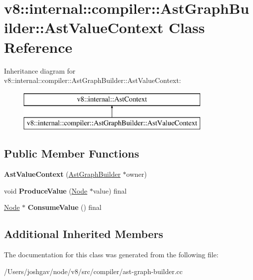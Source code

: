 \hypertarget{classv8_1_1internal_1_1compiler_1_1_ast_graph_builder_1_1_ast_value_context}{}\section{v8\+:\+:internal\+:\+:compiler\+:\+:Ast\+Graph\+Builder\+:\+:Ast\+Value\+Context Class Reference}
\label{classv8_1_1internal_1_1compiler_1_1_ast_graph_builder_1_1_ast_value_context}
Inheritance diagram for v8\+:\+:internal\+:\+:compiler\+:\+:Ast\+Graph\+Builder\+:\+:Ast\+Value\+Context\+:\begin{figure}[H]
\begin{center}
\leavevmode
\includegraphics[height=2.000000cm]{classv8_1_1internal_1_1compiler_1_1_ast_graph_builder_1_1_ast_value_context}
\end{center}
\end{figure}
\subsection*{Public Member Functions}
\begin{DoxyCompactItemize}
\item 
{\bfseries Ast\+Value\+Context} (\hyperlink{classv8_1_1internal_1_1compiler_1_1_ast_graph_builder}{Ast\+Graph\+Builder} $\ast$owner)\hypertarget{classv8_1_1internal_1_1compiler_1_1_ast_graph_builder_1_1_ast_value_context_af1910abb08a912c34739fc864de6ffad}{}\label{classv8_1_1internal_1_1compiler_1_1_ast_graph_builder_1_1_ast_value_context_af1910abb08a912c34739fc864de6ffad}

\item 
void {\bfseries Produce\+Value} (\hyperlink{classv8_1_1internal_1_1compiler_1_1_node}{Node} $\ast$value) final\hypertarget{classv8_1_1internal_1_1compiler_1_1_ast_graph_builder_1_1_ast_value_context_af437d4faee0eb9285ca2fa5b9e522b15}{}\label{classv8_1_1internal_1_1compiler_1_1_ast_graph_builder_1_1_ast_value_context_af437d4faee0eb9285ca2fa5b9e522b15}

\item 
\hyperlink{classv8_1_1internal_1_1compiler_1_1_node}{Node} $\ast$ {\bfseries Consume\+Value} () final\hypertarget{classv8_1_1internal_1_1compiler_1_1_ast_graph_builder_1_1_ast_value_context_a6a256e48a3f86aead790f3cf724425a1}{}\label{classv8_1_1internal_1_1compiler_1_1_ast_graph_builder_1_1_ast_value_context_a6a256e48a3f86aead790f3cf724425a1}

\end{DoxyCompactItemize}
\subsection*{Additional Inherited Members}


The documentation for this class was generated from the following file\+:\begin{DoxyCompactItemize}
\item 
/\+Users/joshgav/node/v8/src/compiler/ast-\/graph-\/builder.\+cc\end{DoxyCompactItemize}
